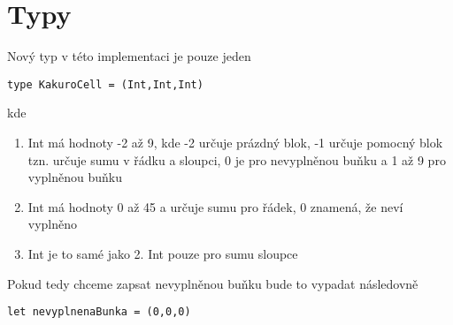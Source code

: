 \section*{Typy}
Nový typ v této implementaci je pouze jeden
\begin{verbatim}
type KakuroCell = (Int,Int,Int)
\end{verbatim}
kde
\begin{enumerate}
\item Int má hodnoty -2 až 9, kde -2 určuje prázdný blok, -1 určuje pomocný blok tzn. určuje sumu v řádku a sloupci, 0 je pro nevyplněnou buňku a 1 až 9 pro vyplněnou buňku
\item Int má hodnoty 0 až 45 a určuje sumu pro řádek, 0 znamená, že neví vyplněno
\item Int je to samé jako 2. Int pouze pro sumu sloupce
\end{enumerate}
Pokud tedy chceme zapsat nevyplněnou buňku bude to vypadat následovně
\begin{verbatim}
let nevyplnenaBunka = (0,0,0)
\end{verbatim}